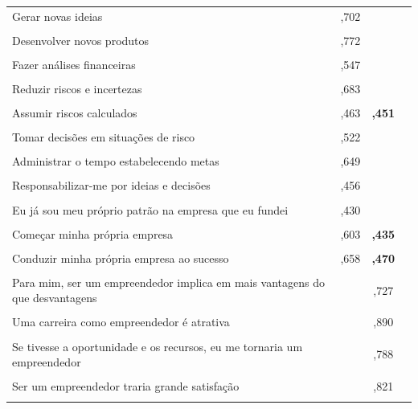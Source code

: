 \begin{center}
\begin{longtable}{p{6cm} c c c }
Gerar novas ideias
 &  ,702 & & \\\\
 
Desenvolver novos produtos
 &  ,772 & & \\\\
 
Fazer análises financeiras
 &  ,547 & & \\\\
 
Reduzir riscos e incertezas
 &  ,683 &  & \\\\
 
Assumir riscos calculados
 &   ,463 & \textbf{,451} & \\\\
 
Tomar decisões em situações de risco
 &   ,522 & & \\\\
 
Administrar o tempo estabelecendo metas
 &   ,649 & & \\\\
 
Responsabilizar-me por ideias e decisões
 & ,456 & &  \\\\
 
Eu já sou meu próprio patrão na empresa que eu fundei
 & ,430 & &  \\\\

Começar minha própria empresa
 & ,603 & \textbf{,435}  & \\\\

Conduzir minha própria empresa ao sucesso
 & ,658 & \textbf{,470}  & \\\\
 
Para mim, ser um empreendedor implica em mais vantagens do que desvantagens
 &  & ,727  & \\\\
 
Uma carreira como empreendedor é atrativa
 &  & ,890  & \\\\
 
Se tivesse a oportunidade e os recursos, eu me tornaria um empreendedor
 &  & ,788 & \\\\
 
Ser um empreendedor traria grande satisfação
 &  & ,821 & \\\\
 

\end{longtable}
\end{center}
